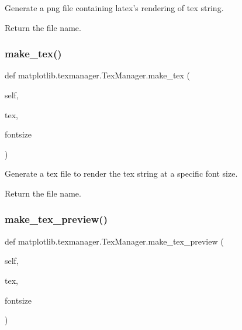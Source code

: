 \begin{DoxyVerb}Generate a png file containing latex's rendering of tex string.

Return the file name.
\end{DoxyVerb}
 \mbox{\label{classmatplotlib_1_1texmanager_1_1TexManager_af9d1e50f4c1bbeb3429389057db4c53d}} 
\subsubsection{\texorpdfstring{make\+\_\+tex()}{make\_tex()}}
{\footnotesize\ttfamily def matplotlib.\+texmanager.\+Tex\+Manager.\+make\+\_\+tex (\begin{DoxyParamCaption}\item[{}]{self,  }\item[{}]{tex,  }\item[{}]{fontsize }\end{DoxyParamCaption})}

\begin{DoxyVerb}Generate a tex file to render the tex string at a specific font size.

Return the file name.
\end{DoxyVerb}
 \mbox{\label{classmatplotlib_1_1texmanager_1_1TexManager_ae1c73425b951e16b24e76cebec350614}} 
\subsubsection{\texorpdfstring{make\+\_\+tex\+\_\+preview()}{make\_tex\_preview()}}
{\footnotesize\ttfamily def matplotlib.\+texmanager.\+Tex\+Manager.\+make\+\_\+tex\+\_\+preview (\begin{DoxyParamCaption}\item[{}]{self,  }\item[{}]{tex,  }\item[{}]{fontsize }\end{DoxyParamCaption})}

